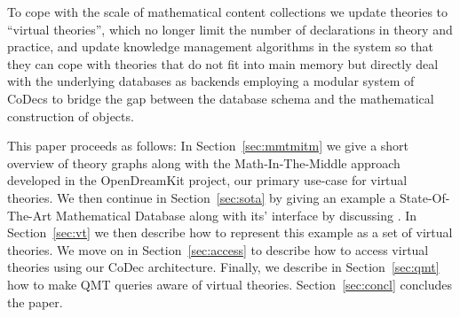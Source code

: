 To cope with the scale of mathematical content collections we update \ommt theories to ``virtual theories'', which no longer limit the number of declarations in theory and practice, and update knowledge management algorithms in the \mmt system so that they can cope with theories that do not fit into main memory but directly deal with the underlying databases as backends employing a modular system of CoDecs to bridge the gap between the database schema and the mathematical construction of objects.

This paper proceeds as follows: 
In Section~\ref{sec:mmtmitm} we give a short overview of \ommt theory graphs along with the Math-In-The-Middle approach developed in the \textsf{OpenDreamKit} project, our primary use-case for virtual theories. 
We then continue in Section~\ref{sec:sota} by giving an example a State-Of-The-Art Mathematical Database along with its' interface by discussing \lmfdb. 
In Section~\ref{sec:vt} we then describe how to represent this example as a set of virtual theories. 
We move on in Section~\ref{sec:access} to describe how to access virtual theories using our CoDec architecture. 
Finally, we describe in Section~\ref{sec:qmt} how to make QMT queries aware of virtual theories. 
Section~\ref{sec:concl} concludes the paper.


